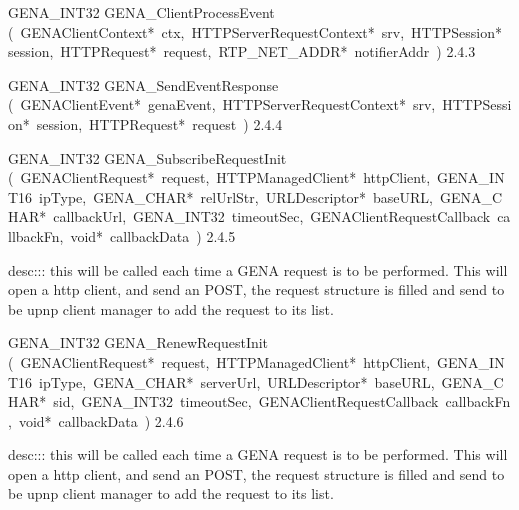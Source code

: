 \documentclass{article}
\begin{document}
\begin{cxxentry}
\begin{cxxentry}
\begin{cxxfunction}
\end{cxxfunction}
\begin{cxxfunction}
{GENA\_INT32}
        {GENA\_ClientProcessEvent}
        {(\ GENAClientContext*\ ctx,\ HTTPServerRequestContext*\ srv,\ HTTPSession*\ session,\ HTTPRequest*\ request,\ RTP\_NET\_ADDR*\ notifierAddr\ )}
        {}
        {2.4.3}
\end{cxxfunction}
\begin{cxxfunction}
{GENA\_INT32}
        {GENA\_SendEventResponse}
        {(\ GENAClientEvent*\ genaEvent,\ HTTPServerRequestContext*\ srv,\ HTTPSession*\ session,\ HTTPRequest*\ request\ )}
        {}
        {2.4.4}
\end{cxxfunction}
\begin{cxxfunction}
{GENA\_INT32}
        {GENA\_SubscribeRequestInit}
        {(\ GENAClientRequest*\ request,\ HTTPManagedClient*\ httpClient,\ GENA\_INT16\ ipType,\ GENA\_CHAR*\ relUrlStr,\ URLDescriptor*\ baseURL,\ GENA\_CHAR*\ callbackUrl,\ GENA\_INT32\ timeoutSec,\ GENAClientRequestCallback\ callbackFn,\ void*\ callbackData\ )}
        {}
        {2.4.5}
\begin{cxxdoc}
desc::: this will be called each time a GENA request is to be performed. This will
open a http client, and send an POST, the request structure is filled and
send to be upnp client manager to add the request to its list.


\end{cxxdoc}
\end{cxxfunction}
\begin{cxxfunction}
{GENA\_INT32}
        {GENA\_RenewRequestInit}
        {(\ GENAClientRequest*\ request,\ HTTPManagedClient*\ httpClient,\ GENA\_INT16\ ipType,\ GENA\_CHAR*\ serverUrl,\ URLDescriptor*\ baseURL,\ GENA\_CHAR*\ sid,\ GENA\_INT32\ timeoutSec,\ GENAClientRequestCallback\ callbackFn,\ void*\ callbackData\ )}
        {}
        {2.4.6}
\begin{cxxdoc}
desc::: this will be called each time a GENA request is to be performed. This will
open a http client, and send an POST, the request structure is filled and
send to be upnp client manager to add the request to its list.



\end{cxxdoc}
\end{cxxfunction}
\end{cxxentry}
\end{cxxentry}
\end{document}
